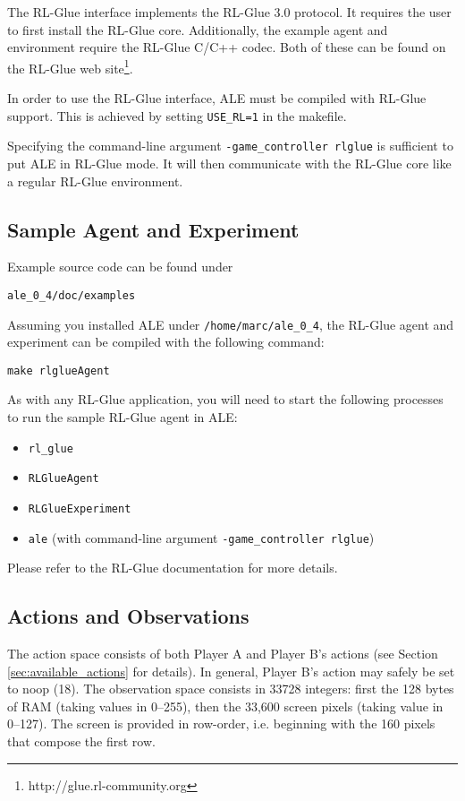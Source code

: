 \documentclass[12pt]{article}
\begin{document}
The RL-Glue interface implements the RL-Glue 3.0 protocol.
It requires the user to first install the RL-Glue core. Additionally, the example agent and 
environment require the RL-Glue C/C++ codec. Both of these can be found on the RL-Glue web
site\footnote{http://glue.rl-community.org}.

In order to use the RL-Glue interface, ALE must be compiled with RL-Glue support. This is achieved
by setting \verb+USE_RL=1+ in the makefile.

Specifying the command-line argument \verb+-game_controller rlglue+ is sufficient to put ALE in 
RL-Glue mode. It will then communicate with the RL-Glue core like a regular RL-Glue environment.

\subsection{Sample Agent and Experiment}

Example source code can be found under

\begin{verbatim}
ale_0_4/doc/examples
\end{verbatim}

Assuming you installed ALE under \verb+/home/marc/ale_0_4+, the RL-Glue agent and experiment
can be compiled with the following command: 

\begin{verbatim}
make rlglueAgent 
\end{verbatim}

As with any RL-Glue application, you will need to start the following processes to run the
sample RL-Glue agent in ALE:

\begin{itemize}
  \item{\verb+rl_glue+} 
  \item{\verb+RLGlueAgent+}
  \item{\verb+RLGlueExperiment+}
  \item{\verb+ale+ (with command-line argument \verb+-game_controller rlglue+)}
\end{itemize}

Please refer to the RL-Glue documentation for more details. 


\subsection{Actions and Observations}

The action space consists of both Player A and Player B's actions (see Section 
\ref{sec:available_actions}
for details). In general, Player B's action may safely be set to noop (18). The observation
space consists in 33728 integers: first the 128 bytes of RAM (taking values in 0--255), then the 
33,600 screen pixels (taking value in 0--127). The screen is provided in row-order, i.e. beginning
with the 160 pixels that compose the first row.
\end{document}
